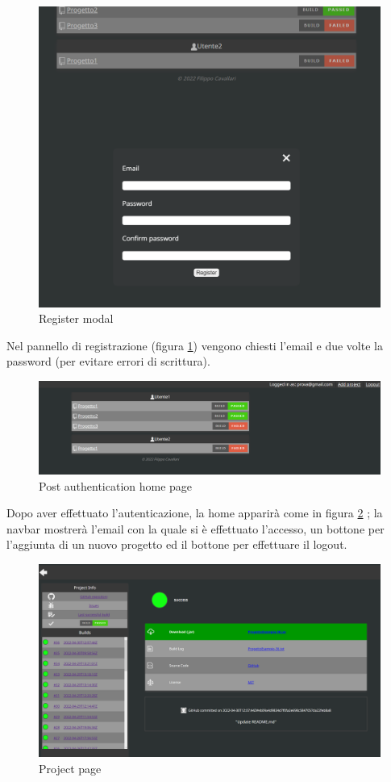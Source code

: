 \documentclass{report}
\begin{document}
\begin{figure}[h!]
\centering
\includegraphics[scale=0.44]{register.png}
\caption{Register modal}
\label{fig:registermodal}
\end{figure}
Nel pannello di registrazione (figura  \ref{fig:registermodal}) vengono chiesti l'email e due volte la password (per evitare errori di scrittura).\\
\begin{figure}[h!]
\centering
\includegraphics[scale=0.44]{postlogin.png}
\caption{Post authentication home page}
\label{fig:postauthhomepage}
\end{figure}
Dopo aver effettuato l'autenticazione, la home apparirà come in figura \ref{fig:postauthhomepage} ; la navbar mostrerà l'email con la quale si è effettuato l'accesso, un bottone per l'aggiunta di un nuovo progetto ed il bottone per effettuare il logout.\\
\begin{figure}[h!]
\centering
\includegraphics[scale=0.44]{progetto.png}
\caption{Project page}
\label{fig:projectpage}
\end{figure}
\end{document}
